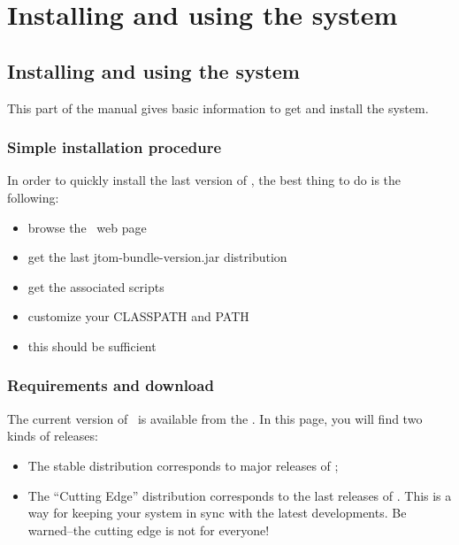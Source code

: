 \part{Installing and using the system}
\chapter{Installing and using the system}
This part of the manual gives basic information to get and install the
system.

\section{Simple installation procedure}
In order to quickly install the last version of \TOM, the best thing
to do is the following:
{\bf
\begin{itemize}
\item browse the \TOM\ web page~
\item get the last jtom-bundle-version.jar distribution
\item get the associated scripts
\item customize your CLASSPATH and PATH
\item this should be sufficient
\end{itemize}
}

\section{Requirements and download}
The current version of \TOM\ is available from the
.
In this page, you will find two kinds of releases:

\begin{itemize}
\item The stable distribution corresponds to major releases of \TOM;
\item The ``Cutting Edge'' distribution corresponds to the last
  releases of \TOM. This is a way for keeping your system in sync with
  the latest developments. Be warned--the cutting edge is not for
  everyone! 
\end{itemize}

